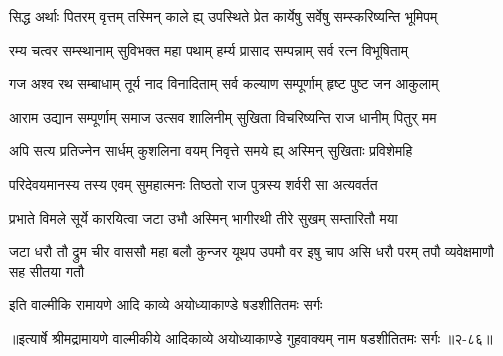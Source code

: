\twolineshloka
{सिद्ध अर्थाः पितरम् वृत्तम् तस्मिन् काले ह्य् उपस्थिते}
{प्रेत कार्येषु सर्वेषु सम्स्करिष्यन्ति भूमिपम्} %

\twolineshloka
{रम्य चत्वर सम्स्थानाम् सुविभक्त महा पथाम्}
{हर्म्य प्रासाद सम्पन्नाम् सर्व रत्न विभूषिताम्} %

\twolineshloka
{गज अश्व रथ सम्बाधाम् तूर्य नाद विनादिताम्}
{सर्व कल्याण सम्पूर्णाम् हृष्ट पुष्ट जन आकुलाम्} %

\twolineshloka
{आराम उद्यान सम्पूर्णाम् समाज उत्सव शालिनीम्}
{सुखिता विचरिष्यन्ति राज धानीम् पितुर् मम} %

\twolineshloka
{अपि सत्य प्रतिज्नेन सार्धम् कुशलिना वयम्}
{निवृत्ते समये ह्य् अस्मिन् सुखिताः प्रविशेमहि} %

\twolineshloka
{परिदेवयमानस्य तस्य एवम् सुमहात्मनः}
{तिष्ठतो राज पुत्रस्य शर्वरी सा अत्यवर्तत} %

\twolineshloka
{प्रभाते विमले सूर्ये कारयित्वा जटा उभौ}
{अस्मिन् भागीरथी तीरे सुखम् सम्तारितौ मया} %

\fourlineindentedshloka
{जटा धरौ तौ द्रुम चीर वाससौ}
{महा बलौ कुन्जर यूथप उपमौ}
{वर इषु चाप असि धरौ परम् तपौ}
{व्यवेक्षमाणौ सह सीतया गतौ} %

\onelineshloka
{इति वाल्मीकि रामायणे आदि काव्ये अयोध्याकाण्डे षडशीतितमः सर्गः} %


॥इत्यार्षे श्रीमद्रामायणे वाल्मीकीये आदिकाव्ये अयोध्याकाण्डे गुहवाक्यम् नाम षडशीतितमः सर्गः ॥२-८६॥
